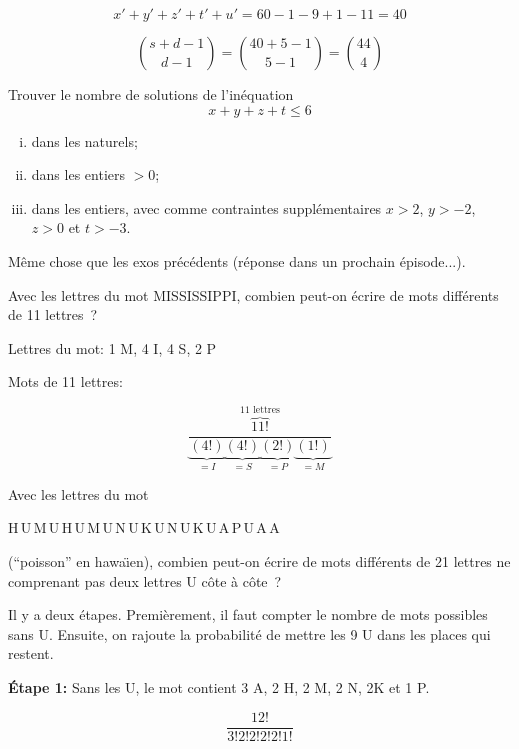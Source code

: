 \[ {x}'+{y}'+{z}'+{t}'+{u}' = 60 - 1 - 9 + 1 - 11 = 40 \]

\[{s + d - 1 \choose d - 1} = {40 + 5 - 1 \choose 5 - 1} = {44 \choose 4} \]

\begin{exo} 
Trouver le nombre de solutions de l'in\'equation
\[
x + y + z + t \leqslant 6
\]
%
\begin{enumerate}[(i)]
\item dans les naturels;
\item dans les entiers $>0$;
\item dans les entiers, avec comme contraintes suppl\'ementaires $x > 2$, $y > -2$, $z > 0$ et $t > -3$.
\end{enumerate}
\end{exo}

Même chose que les exos précédents (réponse dans un prochain épisode...).


\begin{exo} 
Avec les lettres du mot MISSISSIPPI, combien peut-on \'ecrire de mots diff\'erents de 11 lettres~?
\end{exo}

Lettres du mot: 1 M, 4 I, 4 S, 2 P 

Mots de 11 lettres:

\[ \frac{\overbrace{11!}^{\text{11 lettres}}}{\underbrace{(4!)}_{=I}\underbrace{(4!)}_{=S}\underbrace{(2!)}_{=P}\underbrace{(1!)}_{=M}} \]

\newpage

\begin{exo} 
Avec les lettres du mot 
%
\begin{center}
H\,U\,M\,U\,H\,U\,M\,U\,N\,U\,K\,U\,N\,U\,K\,U\,A\,P\,U\,A\,A
\end{center}
(``poisson'' en hawa\"\i{}en), combien peut-on \'ecrire de mots diff\'erents de 21 lettres ne comprenant pas deux lettres U c\^ote \`a c\^ote~?
\end{exo}

Il y a deux étapes. Premièrement, il faut compter le nombre de mots possibles sans U. Ensuite, on rajoute la probabilité de mettre les 9 U dans les places qui restent.

\textbf{Étape 1: } Sans les U, le mot contient 3 A, 2 H, 2 M, 2 N, 2K et 1 P.

\[ \frac{12!}{3! 2! 2! 2! 2! 1!} \]

